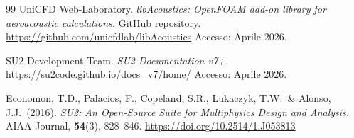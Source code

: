 \documentclass[11pt,a4paper]{article}
\begin{document}
\begin{thebibliography}{99}
UniCFD Web-Laboratory.
\textit{libAcoustics: OpenFOAM add-on library for aeroacoustic calculations.}
GitHub repository.
\url{https://github.com/unicfdlab/libAcoustics}
Accesso: Aprile 2026.

SU2 Development Team.
\textit{SU2 Documentation v7+.}
\url{https://su2code.github.io/docs_v7/home/}
Accesso: Aprile 2026.

Economon, T.D., Palacios, F., Copeland, S.R., Lukaczyk, T.W.\ \& Alonso, J.J.\ (2016).
\textit{SU2: An Open-Source Suite for Multiphysics Design and Analysis.}
AIAA Journal, \textbf{54}(3), 828–846.
\url{https://doi.org/10.2514/1.J053813}

\end{thebibliography}
\end{document}
